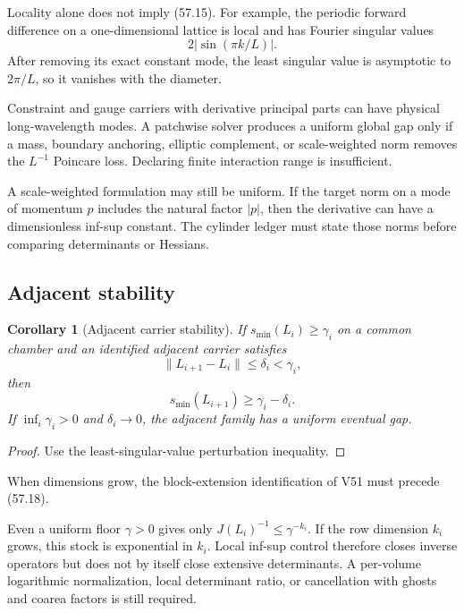 \documentclass[11pt]{article}
\newtheorem{corollary}[theorem]{Corollary}
\begin{document}
Locality alone does not imply (57.15).  For example, the periodic
forward difference on a one-dimensional lattice is local and has
Fourier singular values
\[
                              2|\sin(\pi k/L)|.                \tag{57.17}
\]
After removing its exact constant mode, the least singular value is
asymptotic to \(2\pi/L\), so it vanishes with the diameter.

\begin{warning}
\label{warn:v11v57-poincare}
Constraint and gauge carriers with derivative principal parts can have
physical long-wavelength modes.  A patchwise solver produces a uniform
global gap only if a mass, boundary anchoring, elliptic complement, or
scale-weighted norm removes the \(L^{-1}\) Poincare loss.  Declaring
finite interaction range is insufficient.
\end{warning}

A scale-weighted formulation may still be uniform.  If the target norm
on a mode of momentum \(p\) includes the natural factor \(|p|\), then
the derivative can have a dimensionless inf-sup constant.  The
cylinder ledger must state those norms before comparing determinants
or Hessians.

\subsection{Adjacent stability}

\begin{corollary}[Adjacent carrier stability]
\label{cor:v11v57-adjacent}
If \(s_{\min}(L_i)\ge\gamma_i\) on a common chamber and an identified
adjacent carrier satisfies
\[
                              \lVert L_{i+1}-L_i\rVert
                                   \le\delta_i<\gamma_i,       \tag{57.18}
\]
then
\[
                              s_{\min}(L_{i+1})
                                   \ge\gamma_i-\delta_i.       \tag{57.19}
\]
If \(\inf_i\gamma_i>0\) and \(\delta_i\to0\), the adjacent family has a
uniform eventual gap.
\end{corollary}

\begin{proof}
Use the least-singular-value perturbation inequality.
\end{proof}

When dimensions grow, the block-extension identification of V51 must
precede (57.18).

\begin{warning}
\label{warn:v11v57-determinant}
Even a uniform floor \(\gamma>0\) gives only
\(J(L_i)^{-1}\le\gamma^{-k_i}\).  If the row dimension \(k_i\) grows,
this stock is exponential in \(k_i\).  Local inf-sup control therefore
closes inverse operators but does not by itself close extensive
determinants.  A per-volume logarithmic normalization, local
determinant ratio, or cancellation with ghosts and coarea factors is
still required.
\end{warning}
\end{document}
